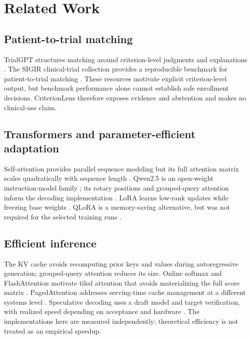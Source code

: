 \section{Related Work}
\subsection{Patient-to-trial matching}
TrialGPT structures matching around criterion-level judgments and explanations \cite{jin2024trialgpt}. The SIGIR clinical-trial collection provides a reproducible benchmark for patient-to-trial matching \cite{koopman2016collection}. These resources motivate explicit criterion-level output, but benchmark performance alone cannot establish safe enrollment decisions. CriterionLens therefore exposes evidence and abstention and makes no clinical-use claim.

\subsection{Transformers and parameter-efficient adaptation}
Self-attention provides parallel sequence modeling but its full attention matrix scales quadratically with sequence length \cite{vaswani2017attention}. Qwen2.5 is an open-weight instruction-model family \cite{yang2025qwen25}; its rotary positions and grouped-query attention inform the decoding implementation \cite{su2021roformer,ainslie2023gqa}. LoRA learns low-rank updates while freezing base weights \cite{hu2022lora}. QLoRA is a memory-saving alternative, but was not required for the selected training runs \cite{dettmers2023qlora}.

\subsection{Efficient inference}
The KV cache avoids recomputing prior keys and values during autoregressive generation; grouped-query attention reduces its size. Online softmax and FlashAttention motivate tiled attention that avoids materializing the full score matrix \cite{milakov2018online,dao2022flashattention}. PagedAttention addresses serving-time cache management at a different systems level \cite{kwon2023pagedattention}. Speculative decoding uses a draft model and target verification, with realized speed depending on acceptance and hardware \cite{leviathan2023speculative}. The implementations here are measured independently; theoretical efficiency is not treated as an empirical speedup.
